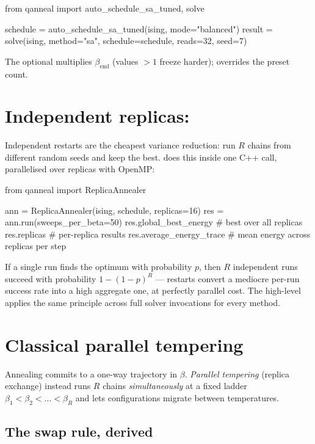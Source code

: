 \begin{pycode}
from qanneal import auto_schedule_sa_tuned, solve

schedule = auto_schedule_sa_tuned(ising, mode="balanced")
result   = solve(ising, method="sa", schedule=schedule, reads=32, seed=7)
\end{pycode}

The optional  multiplies $\beta_{\text{end}}$
(values $>1$ freeze harder);  overrides the preset count.

\section{Independent replicas: }
\label{sec:replica-annealer}

Independent restarts are the cheapest variance reduction: run $R$ chains
from different random seeds and keep the best.  does
this inside one C++ call, parallelised over replicas with OpenMP:

\begin{pycode}
from qanneal import ReplicaAnnealer

ann = ReplicaAnnealer(ising, schedule, replicas=16)
res = ann.run(sweeps_per_beta=50)
res.global_best_energy       # best over all replicas
res.replicas                 # per-replica results
res.average_energy_trace     # mean energy across replicas per step
\end{pycode}

If a single run finds the optimum with probability $p$, then $R$ independent
runs succeed with probability $1-(1-p)^R$ --- restarts convert a mediocre
per-run success rate into a high aggregate one, at perfectly parallel cost.
The high-level  applies the same principle across
full solver invocations for every method.

\section{Classical parallel tempering}
\label{sec:classical-pt}

Annealing commits to a one-way trajectory in $\beta$. \emph{Parallel
tempering} (replica exchange) instead runs $R$ chains \emph{simultaneously}
at a fixed ladder $\beta_1<\beta_2<\dots<\beta_R$ and lets configurations
migrate between temperatures.

\subsection{The swap rule, derived}

